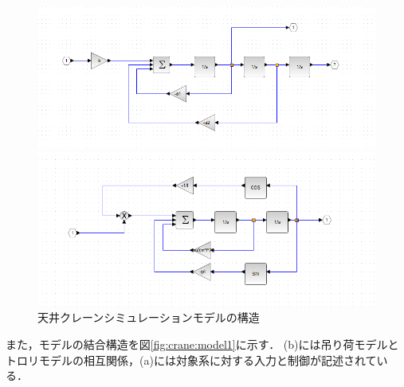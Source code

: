 \documentclass[dvipdfmx,titlepage,a4j]{jsarticle}  %
\begin{document}
\begin{figure}[H]
  \begin{minipage}{6cm}
    \centering
    \includegraphics[keepaspectratio, scale=0.35]{../graph/ex-model-3.png}
  \end{minipage}
  \hfill
  \begin{minipage}{6cm}
    \centering
    \includegraphics[keepaspectratio, scale=0.35]{../graph/ex-model-4.png}
  \end{minipage}
  \caption{天井クレーンシミュレーションモデルの構造}
  \label{fig:crane:model2}
\end{figure}

また，モデルの結合構造を図\ref{fig:crane:model1}に示す．
(b)には吊り荷モデルとトロリモデルの相互関係，(a)には対象系に対する入力と制御が記述されている．
\end{document}
